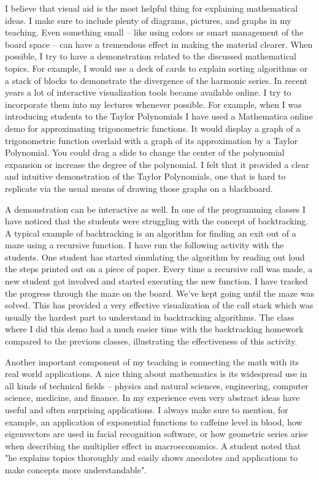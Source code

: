 \documentclass[11pt]{article}
\begin{document}
I believe that visual aid is the most helpful thing for explaining mathematical ideas.
I make sure to include plenty of diagrams, pictures, and graphs in my teaching.
Even something small -- like using colors or smart management of the board space -- can have a tremendous effect in making the material clearer.
When possible, I try to have a demonstration related to the discussed mathematical topics.
For example, I would use a deck of cards to explain sorting algorithms
or a stack of blocks to demonstrate the divergence of the harmonic series.
In recent years a lot of interactive visualization tools became available online.
I try to incorporate them into my lectures whenever possible.
For example, when I was introducing students to the Taylor Polynomials I have used a Mathematica online demo for approximating trigonometric functions.
It would display a graph of a trigonometric function overlaid with a graph of its approximation by a Taylor Polynomial.
You could drag a slide to change the center of the polynomial expansion or increase the degree of the polynomial.
I felt that it provided a clear and intuitive demonstration of the Taylor Polynomials,
one that is hard to replicate via the usual means of drawing those graphs on a blackboard.

A demonstration can be interactive as well.
In one of the programming classes I have noticed that the students were struggling with the concept of backtracking.
A typical example of backtracking is an algorithm for finding an exit out of a maze using a recursive function.
I have run the following activity with the students.
One student has started simulating the algorithm by reading out loud the steps printed out on a piece of paper.
Every time a recursive call was made, a new student got involved and started executing the new function. 
I have tracked the progress through the maze on the board.
We've kept going until the maze was solved.
This has provided a very effective visualization of the call stack which was usually the hardest part to understand in backtracking algorithms.
The class where I did this demo had a much easier time with the backtracking homework compared to the previous classes,
illustrating the effectiveness of this activity.

Another important component of my teaching is connecting the math with its real world applications.
A nice thing about mathematics is its widespread use in all kinds of technical fields
-- physics and natural sciences, engineering, computer science, medicine, and finance.
In my experience even very abstract ideas have useful and often surprising applications.
I always make sure to mention, for example, an application of exponential functions to caffeine level in blood,
how eigenvectors are used in facial recognition software,
or how geometric series arise when describing the multiplier effect in macroeconomics.
A student noted that "he explains topics thoroughly and easily shows anecdotes and applications to make concepts more understandable".
\end{document}
